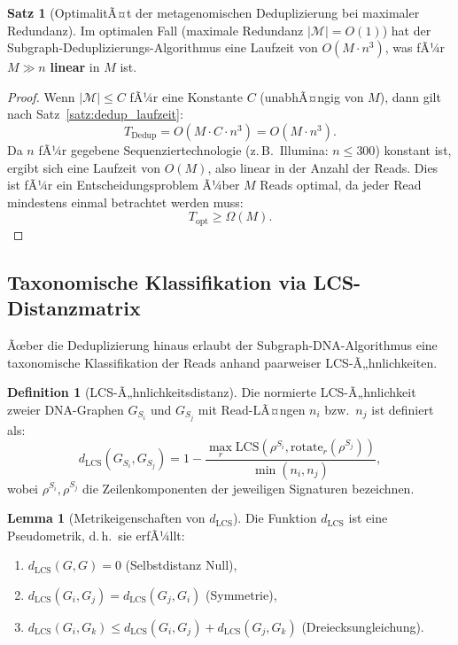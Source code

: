 ﻿\documentclass[a4paper,12pt]{article}
\theoremstyle{definition}
\newtheorem{definition}{Definition}
\newtheorem{satz}{Satz}
\newtheorem{lemma}{Lemma}
\begin{document}
\begin{satz}[OptimalitÃ¤t der metagenomischen Deduplizierung bei maximaler Redundanz]
	\label{satz:meta_optimal}
	Im optimalen Fall (maximale Redundanz $|\mathcal{M}| = O(1)$) hat der
	Subgraph-Deduplizierungs-Algorithmus eine Laufzeit von $O(M \cdot n^3)$,
	was fÃ¼r $M \gg n$ \textbf{linear} in $M$ ist.
\end{satz}

\begin{proof}
	Wenn $|\mathcal{M}| \leq C$ fÃ¼r eine Konstante $C$ (unabhÃ¤ngig von $M$),
	dann gilt nach Satz~\ref{satz:dedup_laufzeit}:
	\[
	T_{\text{Dedup}} = O(M \cdot C \cdot n^3) = O(M \cdot n^3).
	\]
	Da $n$ fÃ¼r gegebene Sequenziertechnologie (z.\,B.\ Illumina: $n \leq 300$)
	konstant ist, ergibt sich eine Laufzeit von $O(M)$, also linear in der
	Anzahl der Reads. Dies ist fÃ¼r ein Entscheidungsproblem Ã¼ber $M$ Reads
	optimal, da jeder Read mindestens einmal betrachtet werden muss:
	\[
	T_{\text{opt}} \geq \Omega(M).
	\]
\end{proof}

\subsection{Taxonomische Klassifikation via LCS-Distanzmatrix}

Ãœber die Deduplizierung hinaus erlaubt der Subgraph-DNA-Algorithmus eine
taxonomische Klassifikation der Reads anhand paarweiser LCS-Ã„hnlichkeiten.

\begin{definition}[LCS-Ã„hnlichkeitsdistanz]
	Die normierte LCS-Ã„hnlichkeit zweier DNA-Graphen $G_{S_i}$ und
	$G_{S_j}$ mit Read-LÃ¤ngen $n_i$ bzw.\ $n_j$ ist definiert als:
	\[
	d_{\mathrm{LCS}}(G_{S_i}, G_{S_j}) = 1 -
	\frac{\max_{r} \mathrm{LCS}(\rho^{S_i},
		\mathrm{rotate}_r(\rho^{S_j}))}{\min(n_i, n_j)},
	\]
	wobei $\rho^{S_i}, \rho^{S_j}$ die Zeilenkomponenten der jeweiligen
	Signaturen bezeichnen.
\end{definition}

\begin{lemma}[Metrikeigenschaften von $d_{\mathrm{LCS}}$]
	\label{lem:metrik}
	Die Funktion $d_{\mathrm{LCS}}$ ist eine Pseudometrik, d.\,h.\ sie
	erfÃ¼llt:
	\begin{enumerate}
		\item $d_{\mathrm{LCS}}(G, G) = 0$ (Selbstdistanz Null),
		\item $d_{\mathrm{LCS}}(G_i, G_j) = d_{\mathrm{LCS}}(G_j, G_i)$
		(Symmetrie),
		\item $d_{\mathrm{LCS}}(G_i, G_k) \leq
		d_{\mathrm{LCS}}(G_i, G_j) + d_{\mathrm{LCS}}(G_j, G_k)$
		(Dreiecksungleichung).
	\end{enumerate}
\end{lemma}
\end{document}
